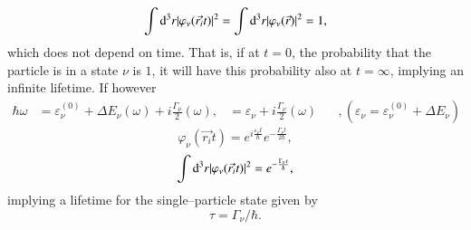 \begin{equation}
\int{\rm d}^3 r |\varphi_{\nu}(\vec{r_i}t)|^2 = \int{\rm d}^3 r |\varphi_{\nu}(\vec{r})|^2 = 1 ,
\label{eqn:44}
\end{equation}
which does not depend on time. That is, if at $t=0$, the probability that the particle is in a state $\nu$ is $1$, it will have this probability also at $t=\infty$, implying an infinite lifetime. If however
\begin{eqnarray}
\nonumber
\hbar\omega &= \varepsilon_{\nu}^{(0)} + \Delta E_{\nu}(\omega) + i \frac{\Gamma_\nu}{2} (\omega),
\nonumber
&= \varepsilon_{\nu} + i \frac{\Gamma_{\nu}}{2}(\omega) \;\;\;\;\;\; , (\varepsilon_{\nu} = \varepsilon_{\nu}^{(0)} + \Delta E_{\nu})
\end{eqnarray}
\begin{equation}
\nonumber
\varphi_{\nu}(\vec{r_i} t) = e^{i \frac{\varepsilon_{\nu} t}{\hbar}} e^{- \frac{\Gamma_{\nu} t}{2\hbar}} ,
\end{equation}
\begin{equation}
\int{\rm d}^3 r |\varphi_{\nu} (\vec{r_i} t)|^2 = e^{- \frac{\Gamma_{\nu} t}{\hbar}} ,
\label{eqn:44b}
\end{equation}
implying a lifetime for the single--particle state given by
\begin{equation}
\tau = \Gamma_\nu/\hbar .
\label{eqn:45}
\end{equation}

